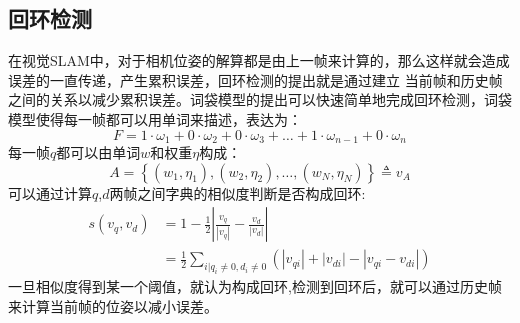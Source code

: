 \subsection{回环检测}
在视觉SLAM中，对于相机位姿的解算都是由上一帧来计算的，那么这样就会造成误差的一直传递，产生累积误差，回环检测的提出就是通过建立
当前帧和历史帧之间的关系以减少累积误差。词袋模型的提出可以快速简单地完成回环检测，词袋模型使得每一帧都可以用单词来描述，表达为：
\begin{equation}
  F=1 \cdot \omega_{1}+0 \cdot \omega_{2}+0 \cdot \omega_{3}+\ldots+1 \cdot \omega_{n-1}+0 \cdot \omega_{n}
\end{equation}
每一帧$q$都可以由单词$w$和权重$\eta$构成：
\begin{equation}
  A=\left\{\left(w_{1}, \eta_{1}\right),\left(w_{2}, \eta_{2}\right), \ldots,\left(w_{N}, \eta_{N}\right)\right\} \triangleq v_{A}
\end{equation}
可以通过计算$q$,$d$两帧之间字典的相似度判断是否构成回环:
\begin{equation}
  \begin{aligned} s\left(v_{q}, v_{d}\right) &=1-\frac{1}{2}\left|\frac{v_{q}}{\left|v_{q}\right|}-\frac{v_{d}}{\left|v_{d}\right|}\right| \\ &=\frac{1}{2} \sum_{i | q_{i} \neq 0, d_{i} \neq 0}\left(\left|v_{q i}\right|+\left|v_{d i}\right|-\left|v_{q i}-v_{d i}\right|\right) \end{aligned}
\end{equation}
一旦相似度得到某一个阈值，就认为构成回环,检测到回环后，就可以通过历史帧来计算当前帧的位姿以减小误差。
